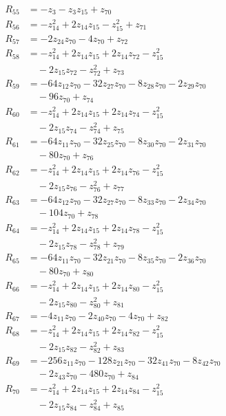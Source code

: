 \begin{align*}
R_{55} &= -z_{3} -z_{3}z_{15} +z_{70} \\
R_{56} &= -z_{14}^{2} +2z_{14}z_{15} -z_{15}^{2} +z_{71} \\
R_{57} &= -2z_{24}z_{70} -4z_{70} +z_{72} \\
R_{58} &= -z_{14}^{2} +2z_{14}z_{15} +2z_{14}z_{72} -z_{15}^{2} \\
&\quad -2z_{15}z_{72} -z_{72}^{2} +z_{73} \\
R_{59} &= -64z_{12}z_{70} -32z_{27}z_{70} -8z_{28}z_{70} -2z_{29}z_{70} \\
&\quad -96z_{70} +z_{74} \\
R_{60} &= -z_{14}^{2} +2z_{14}z_{15} +2z_{14}z_{74} -z_{15}^{2} \\
&\quad -2z_{15}z_{74} -z_{74}^{2} +z_{75} \\
R_{61} &= -64z_{11}z_{70} -32z_{25}z_{70} -8z_{30}z_{70} -2z_{31}z_{70} \\
&\quad -80z_{70} +z_{76} \\
R_{62} &= -z_{14}^{2} +2z_{14}z_{15} +2z_{14}z_{76} -z_{15}^{2} \\
&\quad -2z_{15}z_{76} -z_{76}^{2} +z_{77} \\
R_{63} &= -64z_{12}z_{70} -32z_{27}z_{70} -8z_{33}z_{70} -2z_{34}z_{70} \\
&\quad -104z_{70} +z_{78} \\
R_{64} &= -z_{14}^{2} +2z_{14}z_{15} +2z_{14}z_{78} -z_{15}^{2} \\
&\quad -2z_{15}z_{78} -z_{78}^{2} +z_{79} \\
R_{65} &= -64z_{11}z_{70} -32z_{21}z_{70} -8z_{35}z_{70} -2z_{36}z_{70} \\
&\quad -80z_{70} +z_{80} \\
R_{66} &= -z_{14}^{2} +2z_{14}z_{15} +2z_{14}z_{80} -z_{15}^{2} \\
&\quad -2z_{15}z_{80} -z_{80}^{2} +z_{81} \\
R_{67} &= -4z_{11}z_{70} -2z_{40}z_{70} -4z_{70} +z_{82} \\
R_{68} &= -z_{14}^{2} +2z_{14}z_{15} +2z_{14}z_{82} -z_{15}^{2} \\
&\quad -2z_{15}z_{82} -z_{82}^{2} +z_{83} \\
R_{69} &= -256z_{11}z_{70} -128z_{21}z_{70} -32z_{41}z_{70} -8z_{42}z_{70} \\
&\quad -2z_{43}z_{70} -480z_{70} +z_{84} \\
R_{70} &= -z_{14}^{2} +2z_{14}z_{15} +2z_{14}z_{84} -z_{15}^{2} \\
&\quad -2z_{15}z_{84} -z_{84}^{2} +z_{85} \\

\end{align*}
